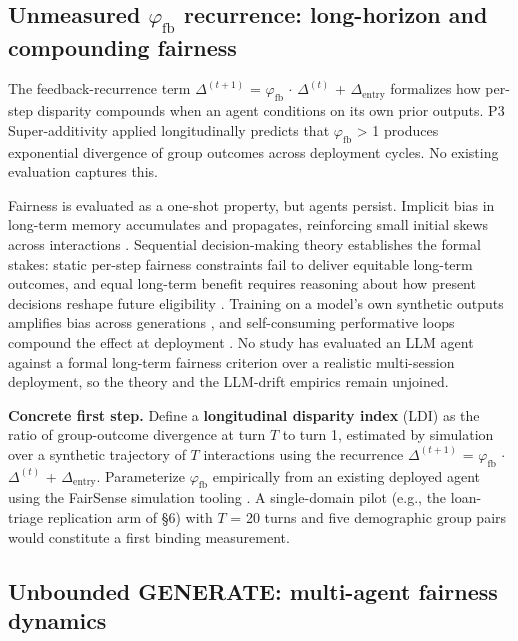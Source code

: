 \documentclass[acmsmall,nonacm]{acmart}
\begin{document}
\subsection{Unmeasured $\varphi_{\mathrm{fb}}$ recurrence: long-horizon and compounding fairness}

The feedback-recurrence term $\Delta^{(t+1)}$ = $\varphi_{\mathrm{fb}}$ $\cdot$ $\Delta^{(t)}$ + $\Delta_{\mathrm{entry}}$ formalizes how per-step disparity compounds when an agent conditions on its own prior outputs. P3 Super-additivity applied longitudinally predicts that $\varphi_{\mathrm{fb}}$ > 1 produces exponential divergence of group outcomes across deployment cycles. No existing evaluation captures this.

Fairness is evaluated as a one-shot property, but agents persist. Implicit bias in long-term memory accumulates and propagates, reinforcing small initial skews across interactions \cite{ma2026implicit}. Sequential decision-making theory establishes the formal stakes: static per-step fairness constraints fail to deliver equitable long-term outcomes, and equal long-term benefit requires reasoning about how present decisions reshape future eligibility \cite{hu2022achieving,xu2024adapting}. Training on a model's own synthetic outputs amplifies bias across generations \cite{wyllie2024fairness}, and self-consuming performative loops compound the effect at deployment \cite{wang2026observations}. No study has evaluated an LLM agent against a formal long-term fairness criterion over a realistic multi-session deployment, so the theory and the LLM-drift empirics \cite{fan2024fairmt,ma2026implicit,liu2025truth} remain unjoined.

\textbf{Concrete first step.} Define a \textbf{longitudinal disparity index} (LDI) as the ratio of group-outcome divergence at turn $T$ to turn 1, estimated by simulation over a synthetic trajectory of $T$ interactions using the recurrence $\Delta^{(t+1)}$ = $\varphi_{\mathrm{fb}}$ $\cdot$ $\Delta^{(t)}$ + $\Delta_{\mathrm{entry}}$. Parameterize $\varphi_{\mathrm{fb}}$ empirically from an existing deployed agent using the FairSense simulation tooling \cite{she2025fairsense}. A single-domain pilot (e.g., the loan-triage replication arm of \S{}6) with $T$ = 20 turns and five demographic group pairs would constitute a first binding measurement.

\subsection{Unbounded GENERATE: multi-agent fairness dynamics}
\end{document}
